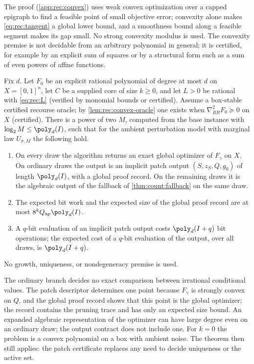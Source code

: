 The proof (\cref{app:rec:convex}) uses weak convex optimization over a capped
epigraph \citep[Definition~2.1.10 and Corollary~4.2.7]{GroetschelLovaszSchrijver1988}
to find a feasible point of small objective error; convexity alone makes
\eqref{eq:rec:tangent} a global lower bound, and a smoothness bound along a
feasible segment makes its gap small. No strong convexity modulus is used.
The convexity premise is not decidable from an arbitrary polynomial in
general; it is certified, for example by an explicit sum of squares or by a
structural form such as a sum of even powers of affine functions.

\begin{theorem}\label{thm:rec:poly}
Fix $d$. Let $F_0$ be an explicit rational polynomial of degree at most $d$
on $X=[0,1]^n$, let $C$ be a supplied core of size $k\ge0$, and let $L>0$ be
rational with \eqref{eq:rec:L} (verified by monomial bounds or certified).
Assume a box-stable certified recourse oracle; by
\cref{lem:rec:convex-oracle} one exists when $\nabla^2_{RR}F_0\succeq0$ on
$X$ (certified). There is a power of two $M$, computed from the base
instance with $\log_2M\le\poly_d(I)$, such that for the ambient perturbation
model with marginal law $U_{\sigma,M}$ the following hold.
\begin{enumerate}[label=(\roman*)]
\item On every draw the algorithm returns an exact global optimizer of
$F_\gamma$ on $X$. On ordinary draws the output is an implicit patch output
$(S,z_S,Q,g_0)$ of length $\poly_d(I)$, with a global proof record. On the
remaining draws it is the algebraic output of the fallback of
\cref{thm:count:fallback} on the same draw.
\item The expected bit work and the expected size of the global proof
record are at most $8^kQ_{\rm ap}\poly_d(I)$.
\item A $q$-bit evaluation of an implicit patch output costs
$\poly_d(I+q)$ bit operations; the expected cost of a $q$-bit evaluation of
the output, over all draws, is $\poly_d(I+q)$.
\end{enumerate}
No growth, uniqueness, or nondegeneracy premise is used.
\end{theorem}

The ordinary branch decides no exact comparison between irrational
conditional values. The patch descriptor determines one point because
$F_\gamma$ is strongly convex on $Q$, and the global proof record shows that
this point is the global optimizer; the record contains the pruning trace and
has only an expected size bound. An expanded algebraic representation of the
optimizer can have large degree even on an ordinary draw; the output contract
does not include one. For $k=0$ the problem is a convex polynomial on a box
with ambient noise. The theorem then still applies: the patch certificate
replaces any need to decide uniqueness or the active set.

